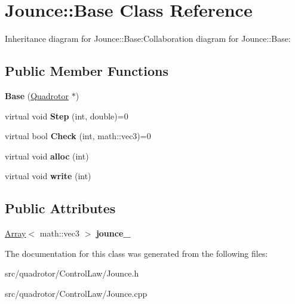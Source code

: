 \hypertarget{classJounce_1_1Base}{
\section{Jounce::Base Class Reference}
\label{classJounce_1_1Base}
}
Inheritance diagram for Jounce::Base:Collaboration diagram for Jounce::Base:\subsection*{Public Member Functions}
\begin{DoxyCompactItemize}
\item 
\hypertarget{classJounce_1_1Base_a8e926179f18af0343dc9d155281a3fef}{
{\bfseries Base} (\hyperlink{classQuadrotor}{Quadrotor} $\ast$)}
\label{classJounce_1_1Base_a8e926179f18af0343dc9d155281a3fef}

\item 
\hypertarget{classJounce_1_1Base_ab541df0d26f27f1ed36584b0d44d3b36}{
virtual void {\bfseries Step} (int, double)=0}
\label{classJounce_1_1Base_ab541df0d26f27f1ed36584b0d44d3b36}

\item 
\hypertarget{classJounce_1_1Base_aba9478612b6891ea4fed47d15d2f0db8}{
virtual bool {\bfseries Check} (int, math::vec3)=0}
\label{classJounce_1_1Base_aba9478612b6891ea4fed47d15d2f0db8}

\item 
\hypertarget{classJounce_1_1Base_a83e3ef78e81ff6f85c46cda167a35cfa}{
virtual void {\bfseries alloc} (int)}
\label{classJounce_1_1Base_a83e3ef78e81ff6f85c46cda167a35cfa}

\item 
\hypertarget{classJounce_1_1Base_afd1ad723f86beb0fde0e960b835a958a}{
virtual void {\bfseries write} (int)}
\label{classJounce_1_1Base_afd1ad723f86beb0fde0e960b835a958a}

\end{DoxyCompactItemize}
\subsection*{Public Attributes}
\begin{DoxyCompactItemize}
\item 
\hypertarget{classJounce_1_1Base_ae4a19256fe64afbceb80c2fdbe584404}{
\hyperlink{classArray}{Array}$<$ math::vec3 $>$ {\bfseries jounce\_\-}}
\label{classJounce_1_1Base_ae4a19256fe64afbceb80c2fdbe584404}

\end{DoxyCompactItemize}


The documentation for this class was generated from the following files:\begin{DoxyCompactItemize}
\item 
src/quadrotor/ControlLaw/Jounce.h\item 
src/quadrotor/ControlLaw/Jounce.cpp\end{DoxyCompactItemize}
